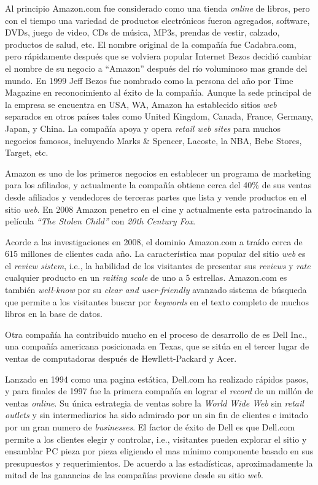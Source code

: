Al principio Amazon.com fue considerado como una tienda \textit{online} de libros, pero con el tiempo una variedad de productos electrónicos fueron agregados, software, DVDs, juego de video, CDs de música, MP3s, prendas de vestir, calzado, productos de salud, etc. El nombre original de la compañía fue Cadabra.com, pero rápidamente después que se volviera popular Internet Bezos decidió cambiar el nombre de su negocio a “Amazon” después del río voluminoso mas grande del mundo. En 1999 Jeff Bezos fue nombrado como la persona del año por Time Magazine en reconocimiento al éxito de la compañía. Aunque la sede principal de la empresa se encuentra en USA, WA, Amazon ha establecido sitios \textit{web} separados en otros países tales como United Kingdom, Canada, France, Germany, Japan, y China. La compañía apoya y opera \textit{retail web sites} para muchos negocios famosos, incluyendo Marks \& Spencer, Lacoste, la NBA, Bebe Stores, Target, etc.

Amazon es uno de los primeros negocios  en establecer un programa de marketing para los afiliados, y actualmente la compañía obtiene cerca del 40\% de sus ventas desde afiliados y vendedores de terceras partes que lista y vende productos en el sitio \textit{web}. En 2008 Amazon penetro en el cine y actualmente esta patrocinando la película \textit{“The Stolen Child”} con \textit{20th Century Fox}.

Acorde a las investigaciones en 2008, el dominio Amazon.com a traído cerca de 615 millones de clientes cada año. La característica mas popular del sitio \textit{web} es el \textit{review sistem}, i.e., la habilidad de los visitantes de presentar sus \textit{reviews} y \textit{rate} cualquier producto en un \textit{raiting scale} de uno a 5 estrellas. Amazon.com es también \textit{well-know} por su \textit{clear and user-friendly} avanzado sistema de búsqueda que permite a los visitantes buscar por \textit{keywords} en el texto completo de muchos libros en la base de datos.

Otra compañía ha contribuido mucho en el proceso de desarrollo de  es Dell Inc., una compañía americana posicionada en Texas, que se sitúa en el tercer lugar de ventas de computadoras después de Hewllett-Packard y Acer.

Lanzado en 1994 como una pagina estática, Dell.com ha realizado rápidos pasos, y para finales de 1997 fue la primera compañía en lograr el \textit{record} de un millón de ventas \textit{online}. Su única estrategia de ventas sobre la \textit{World Wide Web} sin \textit{retail outlets} y sin intermediarios ha sido admirado por un sin fin de clientes e imitado por un gran numero de \textit{ businesses}. El factor de éxito de Dell es que Dell.com permite a los clientes elegir y controlar, i.e., visitantes pueden explorar el sitio y ensamblar PC pieza por pieza eligiendo el mas mínimo componente basado en sus presupuestos y requerimientos. De acuerdo a las estadísticas, aproximadamente la mitad de las ganancias de las compañías proviene desde su sitio \textit{web}.

